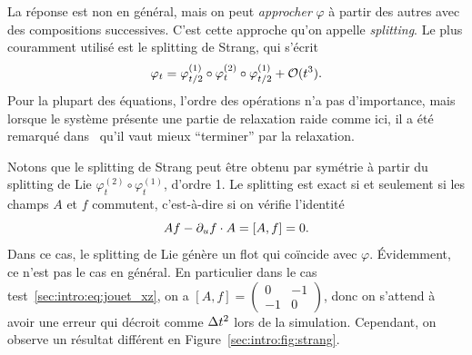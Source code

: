 La réponse est non en général, mais on peut \textit{approcher} $\varphi$ à partir des autres avec des compositions successives. C'est cette approche qu'on appelle \textit{splitting}. Le plus couramment utilisé est le splitting de Strang, qui s'écrit 
\begin{equation*}
    \varphi_t = \varphi^{(1)}_{t/2} \circ \varphi^{(2)}_{t} \circ \varphi^{(1)}_{t/2} + \mathcal{O}(t^3) .
\end{equation*}
Pour la plupart des équations, l'ordre des opérations n'a pas d'importance, mais lorsque le système présente une partie de relaxation raide comme ici, il a été remarqué dans~\cite{sportisse.2000.analysis,descombes.2004.operator} qu'il vaut mieux \enquote{terminer} par la relaxation. 

Notons que le splitting de Strang peut être obtenu par symétrie à partir du splitting de Lie $\varphi^{(2)}_{t} \circ \varphi^{(1)}_{t}$, d'ordre 1. 
Le splitting est exact si et seulement si les champs $A$ et $f$ commutent, c'est-à-dire si on vérifie l'identité 
\begin{equation*}
    Af - \partial_u f \cdot A = [A,f] = 0 .
\end{equation*}
Dans ce cas, le splitting de Lie génère un flot qui coïncide avec $\varphi$. Évidemment, ce n'est pas le cas en général. En particulier dans le cas test~\eqref{sec:intro:eq:jouet_xz}, on a $[A,f] = \begin{pmatrix} 0 & -1 \\ -1 & 0 \end{pmatrix}$, donc on s'attend à avoir une erreur qui décroit comme $\Delta t^2$ lors de la simulation. Cependant, on observe un résultat différent en Figure~\ref{sec:intro:fig:strang}.


